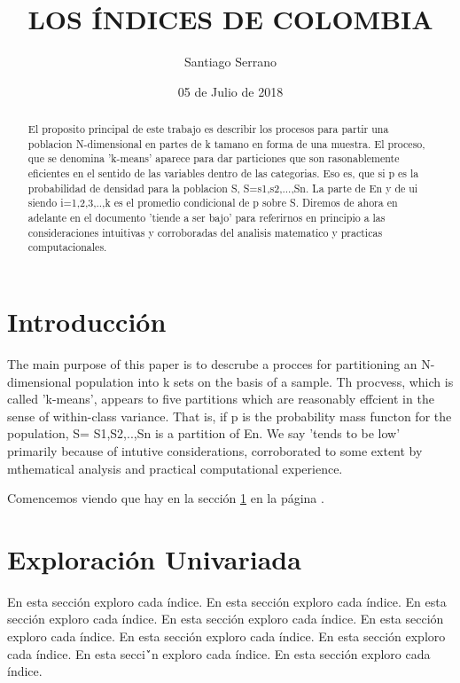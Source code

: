 \documentclass{article}
\title{LOS \'INDICES DE COLOMBIA}
\author[1]{\normalsize Santiago Serrano}
\affil[1,2]{\small  Escuela de Ingenier\'ia,Universidad de los Andes\\
\texttt{{s.serrano11}@uniandes.edu.co}}
\date{05 de Julio de 2018}
\begin{document}


\maketitle



\begin{abstract}
El proposito principal de este trabajo es describir los procesos para partir una poblacion N-dimensional en partes de k tamano en forma de una muestra. El proceso, que se denomina 'k-means' aparece para dar particiones que son rasonablemente eficientes en el sentido de las variables dentro de las categorias. Eso es, que si p es la probabilidad de densidad para la poblacion S, S=s1,s2,...,Sn. La parte de En y de ui siendo i=1,2,3,..,k es el promedio condicional de p sobre S. Diremos de ahora en adelante en el documento 'tiende a ser bajo' para referirnos en principio a las consideraciones intuitivas y corroboradas del analisis matematico y practicas computacionales.
\end{abstract}

\section*{Introducci\'on}

The main purpose of this paper is to descrube a procces for partitioning an N-dimensional population into k sets on the basis of a sample. Th procvess, which is called 'k-means', appears to five partitions which are reasonably effcient in the sense of within-class variance. That is, if p is the probability mass functon for the population, S= S1,S2,..,Sn is a partition of En. We say 'tends to be low' primarily because of intutive considerations, corroborated to some extent by mthematical analysis and practical computational experience.


Comencemos viendo que hay en la secci\'on \ref{univariada} en la p\'agina \pageref{univariada}.

\clearpage



\section{Exploraci\'on Univariada}\label{univariada}

En esta secci\'on exploro cada \'indice. En esta secci\'on exploro cada \'indice. En esta secci\'on exploro cada \'indice. En esta secci\'on exploro cada \'indice. En esta secci\'on exploro cada \'indice. En esta secci\'on exploro cada \'indice. En esta secci\'on exploro cada \'indice. En esta secci\'`n exploro cada \'indice. En esta secci\'on exploro cada \'indice.
\end{document}
